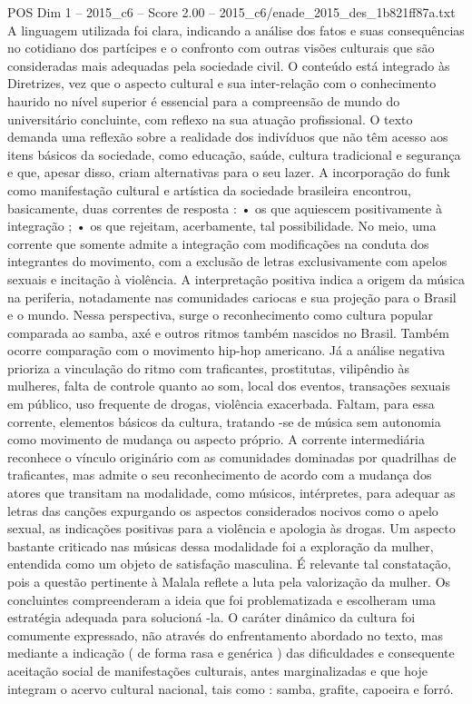 \begin{textsample}{POS Dim 1 – 2015\_c6 – Score 2.00 – 2015\_c6/enade\_2015\_des\_1b821ff87a.txt}
A linguagem utilizada foi clara, indicando a análise dos fatos e suas consequências no cotidiano dos partícipes e o confronto com outras visões culturais que são consideradas mais adequadas pela sociedade civil.
O conteúdo está integrado às Diretrizes, vez que o aspecto cultural e sua inter-relação com o conhecimento haurido no nível superior é essencial para a compreensão de mundo do universitário concluinte, com reflexo na sua atuação profissional.
O texto demanda uma reflexão sobre a realidade dos indivíduos que não têm acesso aos itens básicos da sociedade, como educação, saúde, cultura tradicional e segurança e que, apesar disso, criam alternativas para o seu lazer.
A incorporação do funk como manifestação cultural e artística da sociedade brasileira encontrou, basicamente, duas correntes de resposta : • os que aquiescem positivamente à integração ; • os que rejeitam, acerbamente, tal possibilidade.
No meio, uma corrente que somente admite a integração com modificações na conduta dos integrantes do movimento, com a exclusão de letras exclusivamente com apelos sexuais e incitação à violência.
A interpretação positiva indica a origem da música na periferia, notadamente nas comunidades cariocas e sua projeção para o Brasil e o mundo.
Nessa perspectiva, surge o reconhecimento como cultura popular comparada ao samba, axé e outros ritmos também nascidos no Brasil.
Também ocorre comparação com o movimento hip-hop americano.
Já a análise negativa prioriza a vinculação do ritmo com traficantes, prostitutas, vilipêndio às mulheres, falta de controle quanto ao som, local dos eventos, transações sexuais em público, uso frequente de drogas, violência exacerbada.
Faltam, para essa corrente, elementos básicos da cultura, tratando -se de música sem autonomia como movimento de mudança ou aspecto próprio.
A corrente intermediária reconhece o vínculo originário com as comunidades dominadas por quadrilhas de traficantes, mas admite o seu reconhecimento de acordo com a mudança dos atores que transitam na modalidade, como músicos, intérpretes, para adequar as letras das canções expurgando os aspectos considerados nocivos como o apelo sexual, as indicações positivas para a violência e apologia às drogas.
Um aspecto bastante criticado nas músicas dessa modalidade foi a exploração da mulher, entendida como um objeto de satisfação masculina.
É relevante tal constatação, pois a questão pertinente à Malala reflete a luta pela valorização da mulher.
Os concluintes compreenderam a ideia que foi problematizada e escolheram uma estratégia adequada para solucioná -la.
O caráter dinâmico da cultura foi comumente expressado, não através do enfrentamento abordado no texto, mas mediante a indicação ( de forma rasa e genérica ) das dificuldades e consequente aceitação social de manifestações culturais, antes marginalizadas e que hoje integram o acervo cultural nacional, tais como : samba, grafite, capoeira e forró.

\end{textsample}
